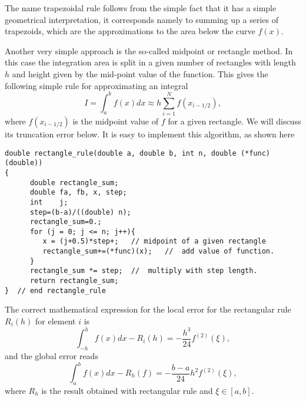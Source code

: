 The name trapezoidal rule follows from the simple fact that it has a simple
geometrical interpretation, it corresponds namely to summing up a series of trapezoids, which are the approximations to the area below the curve $f(x)$. 

Another very simple approach is the so-called midpoint or rectangle method.
In this case the integration area is split in a given number of rectangles with length $h$ and
height given by the mid-point value of the function.  This gives the following simple rule for
approximating an integral
\begin{equation}
   I=\int_a^bf(x) dx \approx  h\sum_{i=1}^N f(x_{i-1/2}), 
   \label{eq:rectangle}
\end{equation}
where $f(x_{i-1/2})$ is the midpoint value of $f$ for a given rectangle. We will discuss its truncation 
error below.  It is easy to implement this algorithm,  as shown here
\lstset{language=c++}
\begin{lstlisting}[title={\url{http://folk.uio.no/mhjensen/compphys/programs/chapter05/cpp/rectangle.cpp}}]
double rectangle_rule(double a, double b, int n, double (*func)(double))
{
      double rectangle_sum;
      double fa, fb, x, step;
      int    j;
      step=(b-a)/((double) n);
      rectangle_sum=0.;
      for (j = 0; j <= n; j++){
         x = (j+0.5)*step+;   // midpoint of a given rectangle
         rectangle_sum+=(*func)(x);   //  add value of function.
      }
      rectangle_sum *= step;  //  multiply with step length.
      return rectangle_sum;
}  // end rectangle_rule 
\end{lstlisting}
The correct mathematical expression for the local error for the rectangular rule $R_i(h)$ for element $i$ is
\[
\int_{-h}^hf(x)dx - R_i(h)=-\frac{h^3}{24}f^{(2)}(\xi),
\]
and the global error reads
\[
\int_a^bf(x)dx -R_h(f)=-\frac{b-a}{24}h^2f^{(2)}(\xi),
\]
where $R_h$ is the result obtained with rectangular rule and $\xi \in [a,b]$.

